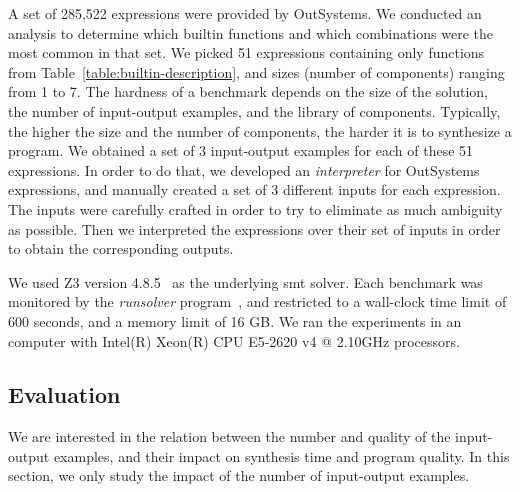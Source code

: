 A set of 285,522 expressions were provided by OutSystems.
We conducted an analysis to determine which builtin functions and which
combinations were the most common in that set.
We picked 51 expressions containing only functions from
Table~\ref{table:builtin-description}, and sizes (number of components) ranging
from 1 to 7.
The hardness of a benchmark depends on the size of the solution, the number of
input-output examples, and the library of components.
Typically, the higher the size and the number of components, the harder it is to
synthesize a program.
We obtained a set of 3 input-output examples for each of these 51 expressions.
In order to do that, we developed an \textit{interpreter} for OutSystems
expressions, and manually created a set of 3 different inputs for each
expression.
The inputs were carefully crafted in order to try to eliminate as much ambiguity
as possible.
Then we interpreted the expressions over their set of inputs in order to
obtain the corresponding outputs.

We used Z3 version 4.8.5~\cite{DeMoura:2008:ZES} as the underlying \gls{smt}
solver. 
Each benchmark was monitored by the \textit{runsolver}
program~\cite{Roussel:2011:JSAT}, and restricted to a wall-clock time limit of
600 seconds, and a memory limit of 16 GB.
We ran the experiments in an computer with Intel(R) Xeon(R) CPU E5-2620 v4 @
2.10GHz processors.

\subsection{Evaluation}
\label{sec:eval}

We are interested in the relation between the number and quality of the
input-output examples, and their impact on synthesis time and program quality.
In this section, we only study the impact of the number of input-output
examples.


